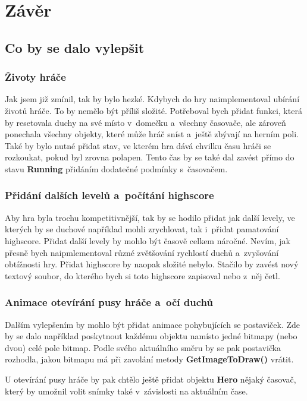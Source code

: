 \documentclass[a4]{article}
\begin{document}
\section{Závěr}
\subsection{Co by se dalo vylepšit}
\subsubsection{Životy hráče}
Jak jsem již zmínil, tak by bylo hezké. Kdybych do hry naimplementoval ubírání životů hráče. To by nemělo být příliš složité. Potřeboval bych přidat funkci, která by resetovala duchy na své místo v~domečku a~všechny časovače, ale zároveň ponechala všechny objekty, které může hráč sníst a~ještě zbývají na herním poli. Také by bylo nutné přidat stav, ve kterém hra dává chvilku času hráči se rozkoukat, pokud byl zrovna polapen. Tento čas by se také dal zavést přímo do stavu \textbf{Running} přidáním dodatečné podmínky s~časovačem.

\subsubsection{Přidání dalších levelů a~počítání highscore}
Aby hra byla trochu kompetitivnější, tak by se hodilo přidat jak další levely, ve kterých by se duchové například mohli zrychlovat, tak i~přidat pamatování highscore. Přidat další levely by mohlo být časově celkem náročné. Nevím, jak přesně bych naipmlementoval různé zvětšování rychlostí duchů a~zvyšování obtížnosti hry. Přidat highscore by naopak složité nebylo. Stačilo by zavést nový textový soubor, do kterého bych si toto highscore zapisoval nebo z~něj četl.

\subsubsection{Animace otevírání pusy hráče a~očí duchů}
Dalším vylepšením by mohlo být přidat animace pohybujících se postaviček. Zde by se dalo například poskytnout každému objektu namísto jedné bitmapy (nebo dvou) celé pole bitmap. Podle svého aktuálního směru by se pak postavička rozhodla, jakou bitmapu má při zavolání metody \textbf{GetImageToDraw()} vrátit.

U otevírání pusy hráče by pak chtělo ještě přidat objektu \textbf{Hero} nějaký časovač, který by umožnil volit snímky také v~závislosti na aktuálním čase.
\end{document}
